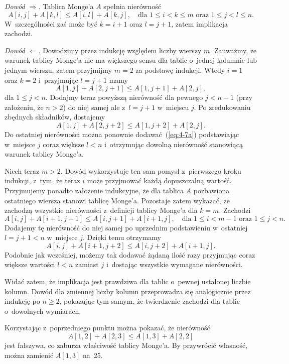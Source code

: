 
\subproblem %
\noindent\emph{Dowód $\Rightarrow$.} Tablica Monge'a $A$ spełnia nierówność
\[
	A[i,j]+A[k,l] \le A[i,l]+A[k,j], \quad\text{dla $1\le i<k\le m$ oraz $1\le j<l\le n$}.
\]
W~szczególności zaś może być $k=i+1$ oraz $l=j+1$, zatem implikacja zachodzi.
\bigskip

\noindent\emph{Dowód $\Leftarrow$.} Dowodzimy przez indukcję względem liczby wierszy $m$. Zauważmy, że warunek tablicy Monge'a nie ma większego sensu dla tablic o~jednej kolumnie lub jednym wierszu, zatem przyjmijmy $m=2$ za podstawę indukcji. Wtedy $i=1$ oraz $k=2$ i~przyjmując $l=j+1$ mamy
\[
	A[1,j]+A[2,j+1] \le A[1,j+1]+A[2,j], \tag{$*$}\label{eq:4-7a}
\]
dla $1\le j<n$. Dodajmy teraz powyższą nierówność dla pewnego $j<n-1$ (przy założeniu, że $n>2$) do niej samej ale z~$l=j+1$ w~miejscu $j$. Po zredukowaniu zbędnych składników, dostajemy
\[
	A[1,j]+A[2,j+2] \le A[1,j+2]+A[2,j].
\]
Do ostatniej nierówności można ponownie dodawać~(\ref{eq:4-7a}) podstawiając w~miejsce $j$ coraz większe $l<n$ i~otrzymując dowolną nierówność stanowiącą warunek tablicy Monge'a.

Niech teraz $m>2$. Dowód wykorzystuje ten sam pomysł z~pierwszego kroku indukcji, z~tym, że teraz $i$ może przyjmować każdą dopuszczalną wartość. Przyjmujemy ponadto założenie indukcyjne, że dla tablica $A$ pozbawiona ostatniego wiersza stanowi tablicę Monge'a. Pozostaje zatem wykazać, że zachodzą wszystkie nierówności z~definicji tablicy Monge'a dla $k=m$. Zachodzi
\[
	A[i,j]+A[i+1,j+1] \le A[i,j+1]+A[i+1,j], \quad\text{dla $1\le i<m-1$ oraz $1\le j<n$}.
\]
Dodajemy tę nierówność do niej samej po uprzednim podstawieniu w~ostatniej $l=j+1<n$ w~miejsce $j$. Dzięki temu otrzymamy
\[
	A[i,j]+A[i+1,j+2] \le A[i,j+2]+A[i+1,j].
\]
Podobnie jak wcześniej, możemy tak dodawać żądaną ilość razy przyjmując coraz większe wartości $l<n$ zamiast $j$ i~dostając wszystkie wymagane nierówności.

Widać zatem, że implikacja jest prawdziwa dla tablic o~pewnej ustalonej liczbie kolumn. Dowód dla zmiennej liczby kolumn przeprowadza się analogicznie przez indukcję po $n\ge2$, pokazując tym samym, że twierdzenie zachodzi dla tablic o~dowolnych wymiarach.

\subproblem %
Korzystając z~poprzedniego punktu można pokazać, że nierówność
\[
	A[1,2]+A[2,3] \le A[1,3]+A[2,2]
\]
jest fałszywa, co zaburza właściwość tablicy Monge'a. By przywrócić własność, można zamienić $A[1,3]$ na~25.

